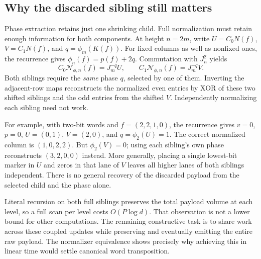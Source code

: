 \subsection{Why the discarded sibling still matters}
Phase extraction retains just one shrinking child. Full normalization
must retain enough information for both components. At height $n=2m$,
write $U=C_0N(f)$, $V=C_1N(f)$, and $q=\phi_m(K(f))$.
For fixed columns as well as nonfixed ones, the recurrence gives
$\phi_n(f)=p(f)+2q$. Commutation with $J_n^2$ yields
\[
 C_0\mathcal N_{\phi,n}(f)=J_m^{-q}U,\qquad
 C_1\mathcal N_{\phi,n}(f)=J_m^{-q}V.
\]
Both siblings require the \emph{same} phase $q$, selected by one of
them. Inverting the adjacent-row maps reconstructs the normalized even
entries by XOR of these two shifted siblings and the odd entries from
the shifted $V$. Independently normalizing each sibling need not work.

For example, with two-bit words and $f=(2,2,1,0)$, the recurrence gives
$v=0$, $p=0$, $U=(0,1)$, $V=(2,0)$, and $q=\phi_2(U)=1$.
The correct normalized column is $(1,0,2,2)$. But $\phi_2(V)=0$;
using each sibling's own phase reconstructs $(3,2,0,0)$ instead.
More generally, placing a single lowest-bit marker in $U$ and zeros
in that lane of $V$ leaves all higher lanes of both siblings independent.
There is no general recovery of the discarded payload from the selected
child and the phase alone.

Literal recursion on both full siblings preserves the total payload
volume at each level, so a full scan per level costs $O(P\log d)$.
That observation is not a lower bound for other computations. The
remaining constructive task is to share work across these coupled
updates while preserving and eventually emitting the entire raw payload.
The normalizer equivalence shows precisely why achieving this in linear
time would settle canonical word transposition.
